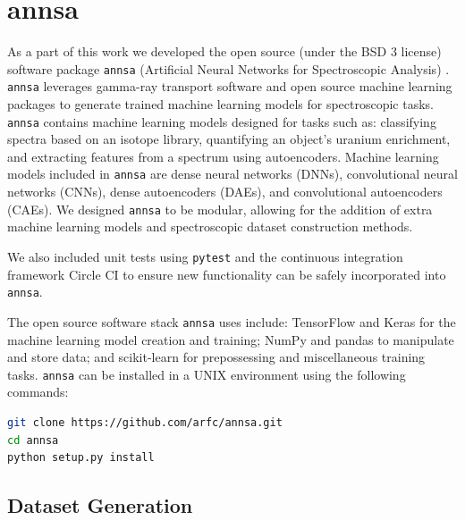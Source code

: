 \section{annsa}

As a part of this work we developed the open source (under the BSD 3 license) software package \verb|annsa| (Artificial Neural Networks for Spectroscopic Analysis) \cite{annsa}. \verb|annsa| leverages gamma-ray transport software and open source machine learning packages to generate trained machine learning models for spectroscopic tasks. \verb|annsa| contains machine learning models designed for tasks such as: classifying spectra based on an isotope library, quantifying an object's uranium enrichment, and extracting features from a spectrum using autoencoders. Machine learning models included in \verb|annsa| are dense neural networks (DNNs), convolutional neural networks (CNNs), dense autoencoders (DAEs), and convolutional autoencoders (CAEs). We designed \verb|annsa| to be modular, allowing for the addition of extra machine learning models and spectroscopic dataset construction methods. 

We also included unit tests using \verb|pytest| \cite{pytest3.5} and the continuous integration framework Circle CI to ensure new functionality can be safely incorporated into \verb|annsa|.

The open source software stack \verb|annsa| uses include: TensorFlow \cite{tensorflow2015-whitepaper} and Keras \cite{chollet2015keras} for the machine learning model creation and training; NumPy \cite{numpy} and pandas \cite{mckinney-proc-scipy-2010} to manipulate and store data; and scikit-learn \cite{scikit-learn} for prepossessing and miscellaneous training tasks. \verb|annsa| can be installed in a UNIX environment using the following commands:
\begin{lstlisting}[language=bash, basicstyle={\small\ttfamily}]
git clone https://github.com/arfc/annsa.git
cd annsa
python setup.py install
\end{lstlisting}
\subsection{Dataset Generation}

